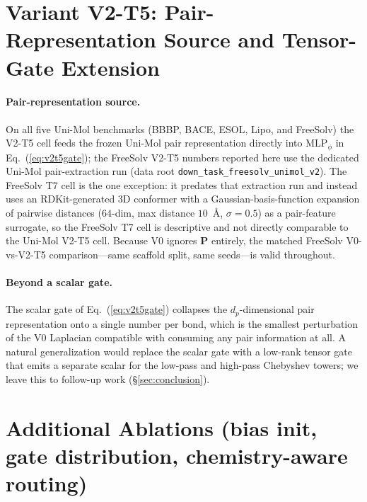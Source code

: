 \documentclass[sigconf,nonacm,anonymous,review]{acmart}
\begin{document}
\section{Variant V2-T5: Pair-Representation Source and Tensor-Gate Extension}
\paragraph{Pair-representation source.} On all five Uni-Mol benchmarks (BBBP, BACE, ESOL, Lipo, and FreeSolv) the V2-T5 cell feeds the frozen Uni-Mol pair representation directly into $\mathrm{MLP}_\phi$ in Eq.~(\ref{eq:v2t5gate}); the FreeSolv V2-T5 numbers reported here use the dedicated Uni-Mol pair-extraction run (data root \texttt{down\_task\_freesolv\_unimol\_v2}). The FreeSolv T7 cell is the one exception: it predates that extraction run and instead uses an RDKit-generated 3D conformer with a Gaussian-basis-function expansion of pairwise distances ($64$-dim, max distance $10$~\AA, $\sigma{=}0.5$) as a pair-feature surrogate, so the FreeSolv T7 cell is descriptive and not directly comparable to the Uni-Mol V2-T5 cell. Because V0 ignores $\mathbf{P}$ entirely, the matched FreeSolv V0-vs-V2-T5 comparison---same scaffold split, same seeds---is valid throughout.

\paragraph{Beyond a scalar gate.} The scalar gate of Eq.~(\ref{eq:v2t5gate}) collapses the $d_p$-dimensional pair representation onto a single number per bond, which is the smallest perturbation of the V0 Laplacian compatible with consuming any pair information at all. A natural generalization would replace the scalar gate with a low-rank tensor gate that emits a separate scalar for the low-pass and high-pass Chebyshev towers; we leave this to follow-up work (\S\ref{sec:conclusion}).

\section{Additional Ablations (bias init, gate distribution, chemistry-aware routing)}
\end{document}
